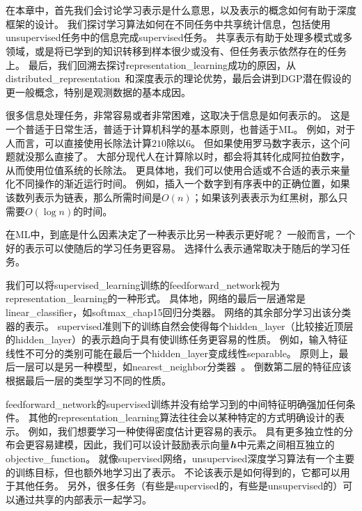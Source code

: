 \chapter{}
\label{chap:representation_learning}
在本章中，首先我们会讨论学习表示是什么意思，以及表示的概念如何有助于深度框架的设计。
我们探讨学习算法如何在不同任务中共享统计信息，包括使用\gls{unsupervised}任务中的信息完成\gls{supervised}任务。
共享表示有助于处理多模式或多领域，或是将已学到的知识转移到样本很少或没有、但任务表示依然存在的任务上。
最后，我们回溯去探讨\gls{representation_learning}成功的原因，从\gls{distributed_representation}~\citep{Hinton-et-al-PDP1986}和深度表示的理论优势，最后会讲到\gls{DGP}潜在假设的更一般概念，特别是观测数据的基本成因。


很多信息处理任务，非常容易或者非常困难，这取决于信息是如何表示的。
这是一个普适于日常生活，普适于计算机科学的基本原则，也普适于\gls{ML}。
例如，对于人而言，可以直接使用长除法计算$210$除以$6$。
但如果使用罗马数字表示，这个问题就没那么直接了。
大部分现代人在计算除以时，都会将其转化成阿拉伯数字，从而使用位值系统的长除法。
更具体地，我们可以使用合适或不合适的表示来量化不同操作的渐近运行时间。
例如，插入一个数字到有序表中的正确位置，如果该数列表示为链表，那么所需时间是$O(n)$；如果该列表表示为红黑树，那么只需要$O(\log n)$的时间。


在\gls{ML}中，到底是什么因素决定了一种表示比另一种表示更好呢？
一般而言，一个好的表示可以使随后的学习任务更容易。
选择什么表示通常取决于随后的学习任务。

我们可以将\gls{supervised_learning}训练的\gls{feedforward_network}视为\gls{representation_learning}的一种形式。
具体地，网络的最后一层通常是\gls{linear_classifier}，如\gls{softmax_chap15}回归分类器。
网络的其余部分学习出该分类器的表示。
\gls{supervised}准则下的训练自然会使得每个\gls{hidden_layer}（比较接近顶层的\gls{hidden_layer}）的表示趋向于具有使训练任务更容易的性质。
例如，输入特征线性不可分的类别可能在最后一个\gls{hidden_layer}变成线性\gls{separable}。
原则上，最后一层可以是另一种模型，如\gls{nearest_neighbor}分类器~\citep{SalakhutdinovR2007-small}。
倒数第二层的特征应该根据最后一层的类型学习不同的性质。


\gls{feedforward_network}的\gls{supervised}训练并没有给学习到的中间特征明确强加任何条件。
其他的\gls{representation_learning}算法往往会以某种特定的方式明确设计的表示。
例如，我们想要学习一种使得密度估计更容易的表示。
具有更多独立性的分布会更容易建模，因此，我们可以设计鼓励表示向量$\boldsymbol{\mathit{h}}$中元素之间相互独立的\gls{objective_function}。
就像\gls{supervised}网络，\gls{unsupervised}深度学习算法有一个主要的训练目标，但也额外地学习出了表示。
不论该表示是如何得到的，它都可以用于其他任务。
另外，很多任务（有些是\gls{supervised}的，有些是\gls{unsupervised}的）可以通过共享的内部表示一起学习。

